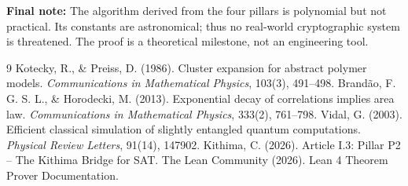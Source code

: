 \documentclass[11pt,a4paper]{article}
\begin{document}
\vspace{0.5cm}
\noindent\textbf{Final note:} The algorithm derived from the four pillars is polynomial but not practical. Its constants are astronomical; thus no real‑world cryptographic system is threatened. The proof is a theoretical milestone, not an engineering tool.


\begin{thebibliography}{9}
  Kotecky, R., \& Preiss, D. (1986). Cluster expansion for abstract polymer models. \emph{Communications in Mathematical Physics}, 103(3), 491–498.
  Brandão, F. G. S. L., \& Horodecki, M. (2013). Exponential decay of correlations implies area law. \emph{Communications in Mathematical Physics}, 333(2), 761–798.
  Vidal, G. (2003). Efficient classical simulation of slightly entangled quantum computations. \emph{Physical Review Letters}, 91(14), 147902.
  Kithima, C. (2026). Article I.3: Pillar P2 – The Kithima Bridge for SAT.
  The Lean Community (2026). Lean 4 Theorem Prover Documentation.
\end{thebibliography}
\end{document}
